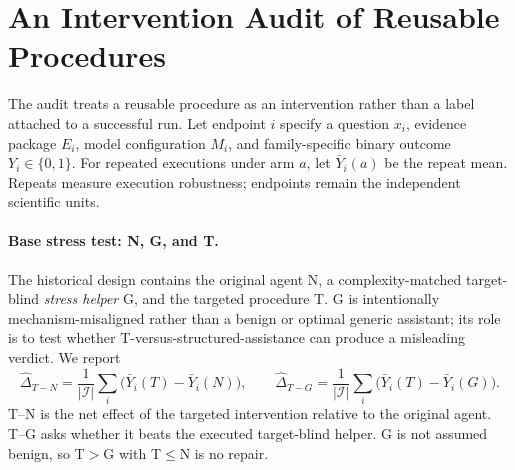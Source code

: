 \section{An Intervention Audit of Reusable Procedures}
\label{sec:mechanism}
The audit treats a reusable procedure as an intervention rather than a label attached to a successful run. Let endpoint $i$ specify a question $x_i$, evidence package $E_i$, model configuration $M_i$, and family-specific binary outcome $Y_i\in\{0,1\}$. For repeated executions under arm $a$, let $\bar Y_i(a)$ be the repeat mean. Repeats measure execution robustness; endpoints remain the independent scientific units.

\paragraph{Base stress test: N, G, and T.}
The historical design contains the original agent N, a complexity-matched target-blind \emph{stress helper} G, and the targeted procedure T. G is intentionally mechanism-misaligned rather than a benign or optimal generic assistant; its role is to test whether T-versus-structured-assistance can produce a misleading verdict. We report
\begin{equation}
\widehat{\Delta}_{T-N}=\frac{1}{|\mathcal I|}\sum_i\bigl(\bar Y_i(T)-\bar Y_i(N)\bigr),\qquad
\widehat{\Delta}_{T-G}=\frac{1}{|\mathcal I|}\sum_i\bigl(\bar Y_i(T)-\bar Y_i(G)\bigr).
\end{equation}
T--N is the net effect of the targeted intervention relative to the original agent. T--G asks whether it beats the executed target-blind helper. G is not assumed benign, so T$>$G with T$\leq$N is no repair.

